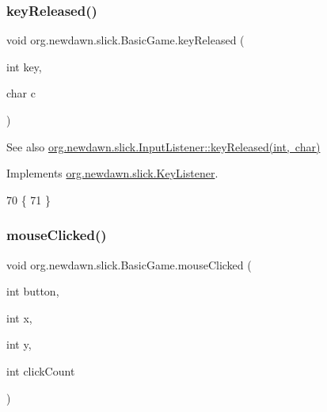 \subsubsection{\texorpdfstring{key\+Released()}{keyReleased()}}
{\footnotesize\ttfamily void org.\+newdawn.\+slick.\+Basic\+Game.\+key\+Released (\begin{DoxyParamCaption}\item[{int}]{key,  }\item[{char}]{c }\end{DoxyParamCaption})\hspace{0.3cm}{\ttfamily [inline]}}

\begin{DoxySeeAlso}{See also}
\mbox{\hyperlink{interfaceorg_1_1newdawn_1_1slick_1_1_key_listener_a474673b59bc77266bcef3c261c26ee2b}{org.\+newdawn.\+slick.\+Input\+Listener\+::key\+Released(int, char)}} 
\end{DoxySeeAlso}


Implements \mbox{\hyperlink{interfaceorg_1_1newdawn_1_1slick_1_1_key_listener_a474673b59bc77266bcef3c261c26ee2b}{org.\+newdawn.\+slick.\+Key\+Listener}}.


\begin{DoxyCode}
70                                              \{
71     \}
\end{DoxyCode}
\mbox{\label{classorg_1_1newdawn_1_1slick_1_1_basic_game_a3103343304121288da2e40cc49466f94}} 
\subsubsection{\texorpdfstring{mouse\+Clicked()}{mouseClicked()}}
{\footnotesize\ttfamily void org.\+newdawn.\+slick.\+Basic\+Game.\+mouse\+Clicked (\begin{DoxyParamCaption}\item[{int}]{button,  }\item[{int}]{x,  }\item[{int}]{y,  }\item[{int}]{click\+Count }\end{DoxyParamCaption})\hspace{0.3cm}{\ttfamily [inline]}}

